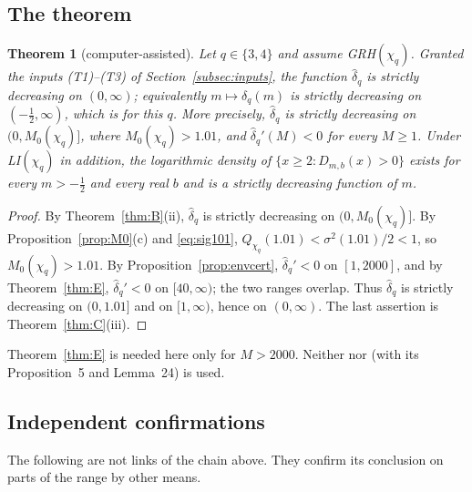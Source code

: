 \documentclass[11pt]{amsart}
\newtheorem{theorem}{Theorem}[section]
\theoremstyle{definition}
\numberwithin{equation}{section}
\newcommand{\hd}{\widehat\delta}
\begin{document}
\subsection{The theorem}

\begin{theorem}[computer-assisted]\label{thm:q34}
Let $q\in\{3,4\}$ and assume GRH$(\chi_q)$. Granted the inputs
\textup{(T1)--(T3)} of Section~\ref{subsec:inputs}, the function
$\hd_q$ is strictly decreasing on $(0,\infty)$; equivalently
$m\mapsto\delta_q(m)$ is strictly decreasing on $(-\tfrac12,\infty)$,
which is \cite[Conjecture~1]{WR} for this $q$. More precisely,
$\hd_q$ is strictly decreasing on $(0,M_0(\chi_q)]$, where
$M_0(\chi_q)>1.01$, and $\hd_q'(M)<0$ for every $M\ge1$. Under
LI$(\chi_q)$ in addition, the logarithmic density of
$\{x\ge2:D_{m,b}(x)>0\}$ exists for every $m>-\tfrac12$ and every real
$b$ and is a strictly decreasing function of $m$.
\end{theorem}

\begin{proof}
By Theorem~\ref{thm:B}(ii), $\hd_q$ is strictly decreasing on
$(0,M_0(\chi_q)]$. By Proposition~\ref{prop:M0}(c) and
\eqref{eq:sig101}, $Q_{\chi_q}(1.01)<\sigma^2(1.01)/2<1$, so
$M_0(\chi_q)>1.01$. By Proposition~\ref{prop:envcert},
$\hd_q'<0$ on $[1,2000]$, and by Theorem~\ref{thm:E}, $\hd_q'<0$ on
$[40,\infty)$; the two ranges overlap. Thus $\hd_q$ is strictly
decreasing on $(0,1.01]$ and on $[1,\infty)$, hence on $(0,\infty)$.
The last assertion is Theorem~\ref{thm:C}(iii).
\end{proof}

Theorem~\ref{thm:E} is needed here only for $M>2000$. Neither
\cite[Theorem~4]{WR} nor \cite[Corollary~7]{WR} (with its
Proposition~5 and Lemma~24) is used.

\subsection{Independent confirmations}\label{subsec:confirm}

The following are not links of the chain above. They confirm its
conclusion on parts of the range by other means.
\end{document}
